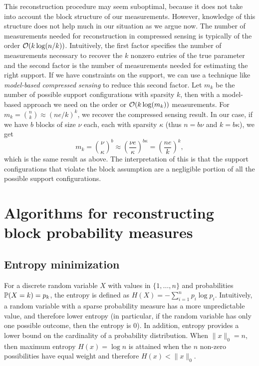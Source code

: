 \documentclass{article} %
\begin{document}
This reconstruction procedure may seem suboptimal, because it does not
take into account the block structure of our measurements.
However, knowledge of this structure does not help much in our situation as we
argue now. The number of measurements needed for reconstruction in
compressed sensing is typically of the order
$\O(k\log(n/k))$.
Intuitively, the first factor specifies the number
of measurements necessary to recover the $k$ nonzero entries of the
true parameter and the second factor is the number of measurements
needed for estimating the right support. If we have constraints on the
support, we can use a technique like \emph{model-based compressed
  sensing} \cite{model_sensing} to reduce this second factor.  
Let $m_k$ be the number of possible support configurations with
sparsity $k$, then with a model-based approach we need on the order or
$\O(k\log(m_k))$ measurements.
For $m_k = {n\choose k}\approx (ne/k)^k$, we recover the compressed
sensing result.
In our case, if we have $b$ blocks of size $\nu$ each, each with
sparsity $\kappa$ (thus $n = b\nu$ and $k=b\kappa$), we get
\begin{equation*}
m_k = {\nu \choose \kappa}^b \approx \left(\frac{\nu
  e}{\kappa}\right)^{b\kappa} = \left(\frac{ne}{k}\right)^k,
\end{equation*}
which is the same result as above. The interpretation of this is that
the support configurations that violate the block assumption are a
negligible portion of all the possible support configurations.


\section{Algorithms for reconstructing block probability measures}
\subsection{Entropy minimization}
For a discrete random variable $X$ with values in $\{1, \dots, n\}$ and probabilities $\P(X = k) = p_k$, the entropy is defined as $H(X)  = -\sum_{i=1}^{n} p_i \log p_i$.
Intuitively, a random variable with a sparse probability measure has a more unpredictable value, and therefore lower entropy (in particular, if the random variable has only one possible outcome, then the entropy is 0).
In addition, entropy provides a lower bound on the cardinality of a probability distribution. When $\|x\|_0 = n$, then maximum entropy $H(x) = \log n$ is attained when the $n$ non-zero possibilities have equal weight and therefore $H(x) < \|x\|_0$.
\end{document}
